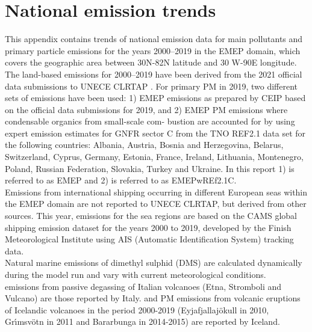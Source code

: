 \setcounter{page}{1}

\cleardoublepage
\chapter[Emission trends]{National emission trends}
\label{ch:appx_emis_trends}


This appendix contains trends of national emission data for main
pollutants and   primary particle emissions for the years
2000--2019 in the EMEP domain, which covers the geographic area between 30\degrees N-82\degrees N latitude and 30\degrees   
W-90\degrees E longitude.\\

The land-based emissions for 2000--2019  have been derived from the  2021 official data submissions to UNECE CLRTAP \citep{CEIP2021}.
For primary PM in 2019, two different sets of emissions have been used: 1) EMEP emissions as prepared by CEIP based on the official data submissions
for 2019, and 2) EMEP PM emissions where condensable organics from small-scale com-
bustion are accounted for by using expert emission estimates for GNFR sector C from the
TNO REF2.1 data set for the following countries: Albania, Austria, Bosnia and Herzegovina,
Belarus, Switzerland, Cyprus, Germany, Estonia, France, Ireland, Lithuania, Montenegro,
Poland, Russian Federation, Slovakia, Turkey and Ukraine. In this report 1) is referred to as EMEP and 2) is referred to as EMEPwREf2.1C.\\

Emissions from international shipping occurring in different European seas within the EMEP domain are not reported to UNECE CLRTAP, but derived from other sources. This year, emissions for the sea regions are based on the CAMS global shipping emission dataset \citep{CAMSemis2019,ECCAD} for the years 2000 to 2019, developed by the Finish Meteorological Institute using AIS (Automatic Identification System) tracking data.\\

Natural marine emissions of dimethyl sulphid (DMS) are calculated dynamically during the model run and vary with current meteorological conditions.\\

\sox emissions from passive degassing of Italian volcanoes (Etna,
Stromboli and Vulcano) are those reported by
Italy. \sox and PM emissions from volcanic eruptions of Icelandic volcanoes in the period 2000-2019 (Eyjafjallaj\"okull in 2010, Gr{\'{\i}}msv{\"{o}}tn in 2011  and  Bar\dh{}arbunga in 2014-2015) are reported by Iceland.  \\


